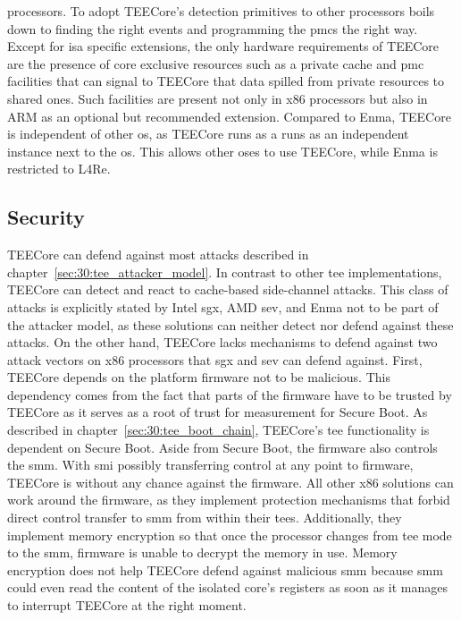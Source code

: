 processors. To adopt TEECore's detection primitives to other processors boils
down to finding the right events and programming the \glspl{pmc} the right way.
Except for \gls{isa} specific extensions, the only hardware requirements of
TEECore are the presence of core exclusive resources such as a private cache and
\gls{pmc} facilities that can signal to TEECore that data spilled from private
resources to shared ones. Such facilities are present not only in x86 processors
but also in ARM as an optional but recommended extension. Compared to Enma,
TEECore is independent of other \gls{os}, as TEECore runs as a runs as
an independent instance next to the \gls{os}. This allows other \gls{os}es to
use TEECore, while Enma is restricted to L4Re.

\subsection{Security}
\label{eval:compare:security}
TEECore can defend against most attacks described in
chapter~\ref{sec:30:tee_attacker_model}. In contrast to other \gls{tee}
implementations, TEECore can detect and react to cache-based side-channel
attacks. This class of attacks is explicitly stated by Intel \gls{sgx}, AMD
\gls{sev}, and Enma not to be part of the attacker model, as these solutions can
neither detect nor defend against these attacks. On the other hand, TEECore
lacks mechanisms to defend against two attack vectors on x86 processors that
\gls{sgx} and \gls{sev} can defend against. First, TEECore depends on the
platform firmware not to be malicious. This dependency comes from the fact that
parts of the firmware have to be trusted by TEECore as it serves as a root of
trust for measurement for Secure Boot. As described in
chapter~\ref{sec:30:tee_boot_chain}, TEECore's \gls{tee} functionality is
dependent on Secure Boot. Aside from Secure Boot, the firmware also controls the
\gls{smm}. With \gls{smi} possibly transferring control at any point to
firmware, TEECore is without any chance against the firmware. All other x86
solutions can work around the firmware, as they implement protection mechanisms
that forbid direct control transfer to \gls{smm} from within their \glspl{tee}.
Additionally, they implement memory encryption so that once the processor
changes from \gls{tee} mode to the \gls{smm}, firmware is unable to decrypt the
memory in use. Memory encryption does not help TEECore defend against malicious
\gls{smm} because \gls{smm} could even read the content of the isolated core's
registers as soon as it manages to interrupt TEECore at the right moment.
